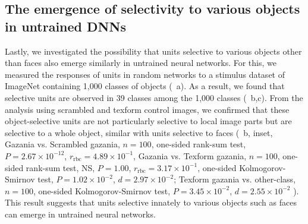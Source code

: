 \documentclass[sn-mathphys]{sn-jnl}%
\theoremstyle{thmstyleone}%
\theoremstyle{thmstyletwo}%
\theoremstyle{thmstylethree}%
\begin{document}
\subsection{The emergence of selectivity to various objects in untrained DNNs}
Lastly, we investigated the possibility that units selective to various objects other than faces also emerge similarly in untrained neural networks.
For this, we measured the responses of units in random networks to a stimulus dataset of ImageNet containing 1,000 classes of objects (~a).
As a result, we found that selective units are observed in 39 classes among the 1,000 classes (~b,c).
From the analysis using scrambled and texform control images, we confirmed that these object-selective units are not particularly selective to local image parts but are selective to a whole object, similar with units selective to faces
(~b, inset,
Gazania vs. Scrambled gazania, 
$ n=100 $,
one-sided rank-sum test,
$ P = 2.67 \times 10^{-12} $,
$ r_\textrm{rbc} = 4.89 \times 10^{-1} $,
%
Gazania vs. Texform gazania, 
$ n = 100 $,
one-sided rank-sum test, NS,
$ P = 1.00 $,
$ r_\textrm{rbc} = 3.17 \times 10^{-1} $,
one-sided Kolmogorov-Smirnov test,
$ P = 1.02 \times 10^{-2} $,
$ d = 2.97 \times 10^{-2} $;
% 
Texform gazania vs. other-class,
$ n = 100 $,
one-sided Kolmogorov-Smirnov test,
$ P = 3.45 \times 10^{-2} $,
$ d = 2.55 \times 10^{-2} $
).
This result suggests that units selective innately to various objects such as faces can emerge in untrained neural networks.
\end{document}
